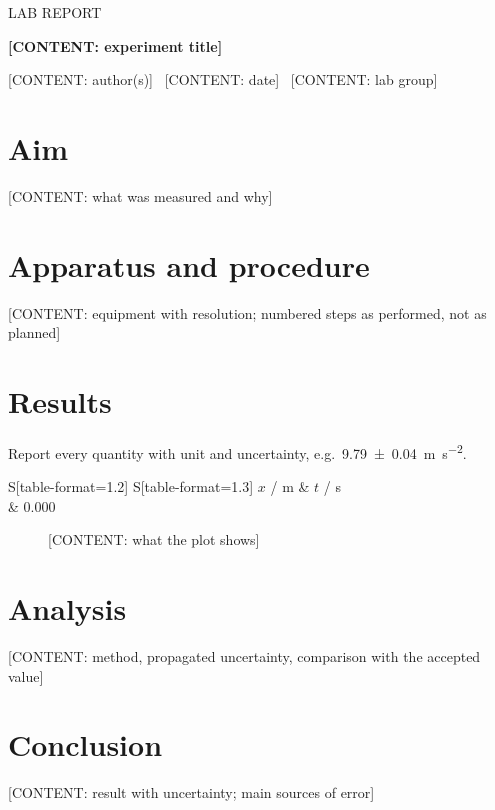 \documentclass[11pt,a4paper]{scrartcl}
\begin{document}
{\sffamily\small LAB REPORT\par}
{\sffamily\LARGE\bfseries [CONTENT: experiment title]\par}
{\small [CONTENT: author(s)] \textperiodcentered\ [CONTENT: date] \textperiodcentered\ [CONTENT: lab group]\par}

\section{Aim}
{}[CONTENT: what was measured and why]

\section{Apparatus and procedure}
{}[CONTENT: equipment with resolution; numbered steps as performed, not as planned]

\section{Results}
Report every quantity with unit and uncertainty, e.g.\ \SI{9.79 \pm 0.04}{\metre\per\second\squared}.

\begin{table}[ht]
\centering
\caption{[CONTENT: raw measurements]}\label{tab:data}
\begin{tabular}{S[table-format=1.2] S[table-format=1.3]}
\toprule
{$x$ / \si{\metre}} & {$t$ / \si{\second}} \\
 & 0.000 \\
\bottomrule
\end{tabular}
\end{table}

\begin{figure}[ht]
\centering
{}
\caption{[CONTENT: what the plot shows]}\label{fig:data}
\end{figure}

\section{Analysis}
{}[CONTENT: method, propagated uncertainty, comparison with the accepted value]

\section{Conclusion}
{}[CONTENT: result with uncertainty; main sources of error]
\end{document}
